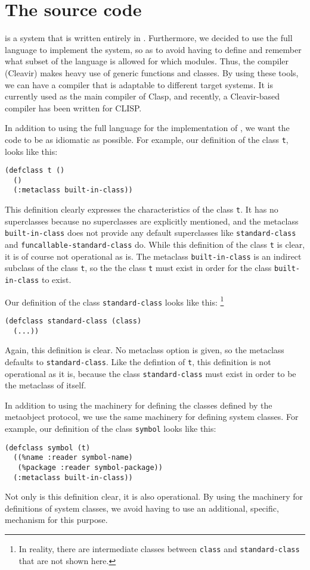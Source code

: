 \section{The \sicl{} source code}

\sicl{} is a system that is written entirely in \commonlisp{}.
Furthermore, we decided to use the full language to implement the
system, so as to avoid having to define and remember what subset of
the language is allowed for which modules.  Thus, the compiler
(Cleavir) makes heavy use of generic functions and classes.  By using
these tools, we can have a compiler that is adaptable to different
target systems.  It is currently used as the main compiler of Clasp,
and recently, a Cleavir-based compiler has been written for CLISP.

In addition to using the full language for the implementation of
\sicl{}, we want the code to be as idiomatic as possible.  For
example, our definition of the class \texttt{t}, looks like this:

\begin{verbatim}
(defclass t ()
  ()
  (:metaclass built-in-class))
\end{verbatim}

This definition clearly expresses the characteristics of the class
\texttt{t}.  It has no superclasses because no superclasses are
explicitly mentioned, and the metaclass \texttt{built-in-class} does
not provide any default superclasses like \texttt{standard-class} and
\texttt{funcallable-standard-class} do.  While this definition of the
class \texttt{t} is clear, it is of course not operational as is.  The
metaclass \texttt{built-in-class} is an indirect subclass of the class
\texttt{t}, so the the class \texttt{t} must exist in order for the
class \texttt{built-in-class} to exist.

Our definition of the class \texttt{standard-class} looks like this:%
\footnote{In reality, there are intermediate classes between
  \texttt{class} and \texttt{standard-class} that are not shown here.}

\begin{verbatim}
(defclass standard-class (class)
  (...))
\end{verbatim}

Again, this definition is clear.  No metaclass option is given, so the
metaclass defaults to \texttt{standard-class}.  Like the defintion of
\texttt{t}, this definition is not operational as it is, because the
class \texttt{standard-class} must exist in order to be the metaclass
of itself.

In addition to using the \clos{} machinery for defining the classes
defined by the metaobject protocol, we use the same machinery for
defining system classes.  For example, our definition of the class
\texttt{symbol} looks like this:

\begin{verbatim}
(defclass symbol (t)
  ((%name :reader symbol-name)
   (%package :reader symbol-package))
  (:metaclass built-in-class))
\end{verbatim}

Not only is this definition clear, it is also operational.  By using
the \clos{} machinery for definitions of system classes, we avoid
having to use an additional, specific, mechanism for this purpose.
